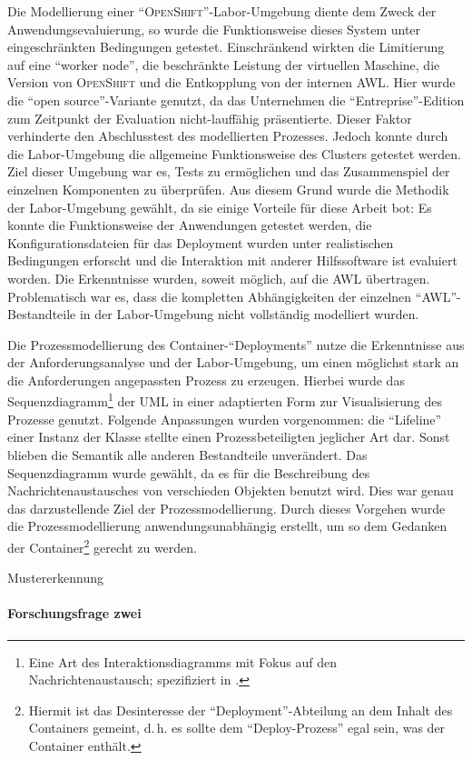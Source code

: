 Die Modellierung einer \enquote{\textsc{OpenShift}}-Labor-Umgebung diente dem Zweck der Anwendungsevaluierung, so wurde die Funktionsweise dieses System unter eingeschränkten Bedingungen getestet. Einschränkend wirkten die Limitierung auf eine \enquote{worker node}, die beschränkte Leistung der virtuellen Maschine, die Version von \textsc{OpenShift} und die Entkopplung von der internen \ac{AWL}. Hier wurde die \enquote{open source}-Variante genutzt, da das Unternehmen die \enquote{Entreprise}-Edition zum Zeitpunkt der Evaluation nicht-lauffähig präsentierte. Dieser Faktor verhinderte den Abschlusstest des modellierten Prozesses. Jedoch konnte durch die Labor-Umgebung die allgemeine Funktionsweise des Clusters getestet werden. Ziel dieser Umgebung war es, Tests zu ermöglichen und das Zusammenspiel der einzelnen Komponenten zu überprüfen. Aus diesem Grund wurde die Methodik der Labor-Umgebung gewählt, da sie einige Vorteile für diese Arbeit bot: Es konnte die Funktionsweise der Anwendungen getestet werden, die Konfigurationsdateien für das Deployment wurden unter realistischen Bedingungen erforscht und die Interaktion mit anderer Hilfssoftware ist evaluiert worden. Die Erkenntnisse wurden, soweit möglich, auf die \ac{AWL} übertragen. Problematisch war es, dass die kompletten Abhängigkeiten der einzelnen \enquote{\ac{AWL}}-Bestandteile in der Labor-Umgebung nicht vollständig modelliert wurden.
\par
Die Prozessmodellierung des Container-\enquote{Deployments} nutze die Erkenntnisse aus der Anforderungsanalyse und der Labor-Umgebung, um einen möglichst stark an die Anforderungen angepassten Prozess zu erzeugen. Hierbei wurde das Sequenzdiagramm\footnote{Eine Art des Interaktionsdiagramms mit Fokus auf den Nachrichtenaustausch; spezifiziert in \cite[][S.\,595-599]{object_management_group_omg_unified_2017}.} der \ac{UML} in einer adaptierten Form zur Visualisierung des Prozesse genutzt. Folgende Anpassungen wurden vorgenommen: die \enquote{Lifeline} einer Instanz der Klasse stellte einen Prozessbeteiligten jeglicher Art dar. Sonst blieben die Semantik alle anderen Bestandteile unverändert. Das Sequenzdiagramm wurde gewählt, da es für die Beschreibung des Nachrichtenaustausches von verschieden Objekten benutzt wird. Dies war genau das darzustellende Ziel der Prozessmodellierung. Durch dieses Vorgehen wurde die Prozessmodellierung anwendungsunabhängig erstellt, um so dem Gedanken der Container\footnote{Hiermit ist das Desinteresse der \enquote{Deployment}-Abteilung an dem Inhalt des Containers gemeint, d.\,h. es sollte dem  \enquote{Deploy-Prozess} egal sein, was der Container enthält.} gerecht zu werden. 
\par
Mustererkennung 

\paragraph{Forschungsfrage zwei}

